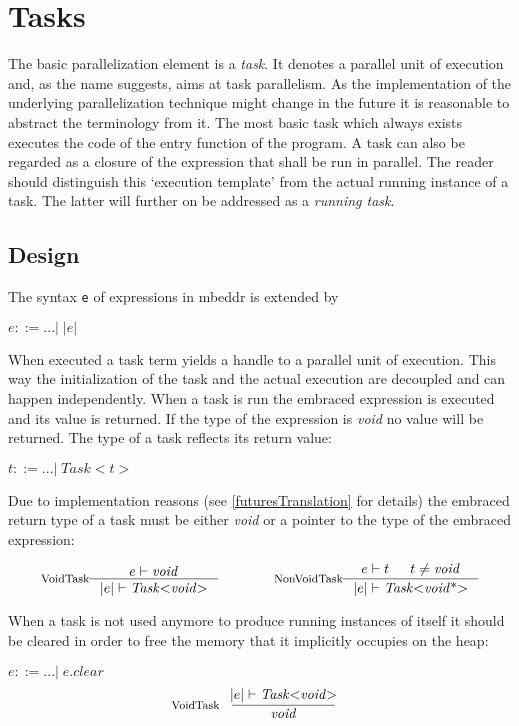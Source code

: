\section{Tasks}
The basic parallelization element is a \textit{task}. It denotes a parallel unit of execution and, as the name suggests, aims at task parallelism. As the implementation of the underlying parallelization technique might change in the future it is reasonable to abstract the terminology from it. The most basic task which always exists executes the code of the entry function of the program. A task can also be regarded as a closure of the expression that shall be run in parallel. The reader should distinguish this `execution template' from the actual running instance of a task. The latter will further on be addressed as a \textit{running task}.
\subsection{Design}
The syntax \texttt{e} of expressions in mbeddr is extended by

$e ::= ...|\;\mathit{|e|}$

When executed a task term yields a handle to a parallel unit of execution. This way the initialization of the task and the actual execution are decoupled and can happen independently. When a task is run the embraced expression is executed and its value is returned. If the type of the expression is \textit{void} no value will be returned. The type of a task reflects its return value:

$t ::= ... |\;\mathit{Task{<}t{>}}$

Due to implementation reasons (see \ref{futuresTranslation} for details) the embraced return type of a task must be either \textit{void} or a pointer to the type of the embraced expression:

\begin{align*}
\inference*[VoidTask]{e |- \mathit{void}}{|e| |- \mathit{Task{<}void{>}}} 
\qquad\qquad
\inference*[NonVoidTask]{e |- t & t \neq \mathit{void}}{|e| |- \mathit{Task{<}void{\text{*}}{>}}}
\end{align*}

When a task is not used anymore to produce running instances of itself it should be cleared in order to free the memory that it implicitly occupies on the heap:

$e ::= ...|\;e.\mathit{clear}$
\begin{align*}
\inference*[VoidTask]{|e| |- \mathit{Task{<}void{>}}}{\qquad\mathit{void}\qquad} 
\end{align*}

